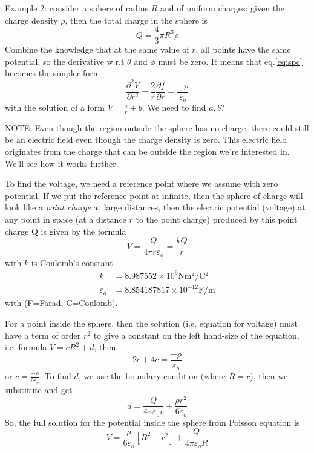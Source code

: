 Example 2: consider a sphere of radius $R$ and of uniform charges: given the
charge density $\rho$, then the total charge in the sphere is 
\begin{equation}
Q = \frac{4}{3}\pi R^3\rho
\end{equation}
Combine the knowledge that at the same value
of $r$, all points have the same potential, so the derivative w.r.t $\theta$ and
$\phi$ must be zero. It means that eq.\ref{eq:spc} becomes the simpler form
\begin{equation}
\frac{\partial^2 V}{\partial r^2} + \frac{2}{r}\frac{\partial f}{\partial r} =
\frac{-\rho}{\varepsilon_o}
\end{equation}  
with the solution of a form $V=\frac{a}{r}+b$. We need to find $a,b$?

NOTE: Even though the region outside the sphere has no charge, there could still
be an electric field even though the charge density is zero. This electric field
originates from the charge that can be outside the region we're interested in.
We'll see how it works further.

To find the voltage, we need a reference point where we assume with zero
potential. If we put the reference point at infinite, then the sphere of charge
will look like a {\it point charge} at large distances, then the electric
potential (voltage) at any point in space (at a distance $r$ to the point
charge) produced by this point charge Q is given by the formula
\begin{equation}
V = \frac{Q}{4\pi r \varepsilon_o} = \frac{kQ}{r}
\end{equation}
with $k$ is Coulomb's constant
\begin{equation}
\begin{split}
k &= 8.987552\times 10^9 \text{Nm$^2$/C$^2$} \\
\varepsilon_o &= 8.854187817\times 10^{-12} \text{F/m}
\end{split}
\end{equation}
with (F=Farad, C=Coulomb).

For a point inside the sphere, then the solution (i.e. equation for voltage)
must have a term of order $r^2$ to give a constant on the left hand-size of the
equation, i.e. formula $V = cR^2+d$, then 
\begin{equation}
2c + 4c = \frac{-\rho}{\varepsilon_o}
\end{equation}
or $c=\frac{-\rho}{6\varepsilon_o}$. To find $d$, we use the boundary condition
(where $R=r$), then we substitute and get
\begin{equation}
d = \frac{Q}{4\pi\varepsilon_o r} + \frac{\rho r^2}{6\varepsilon_o}
\end{equation}
So, the full solution for the potential inside the sphere from Poisson equation
is
\begin{equation}
V = \frac{\rho}{6\varepsilon_o} \left[ R^2-r^2 \right] +
\frac{Q}{4\pi\varepsilon_o R}
\end{equation}

